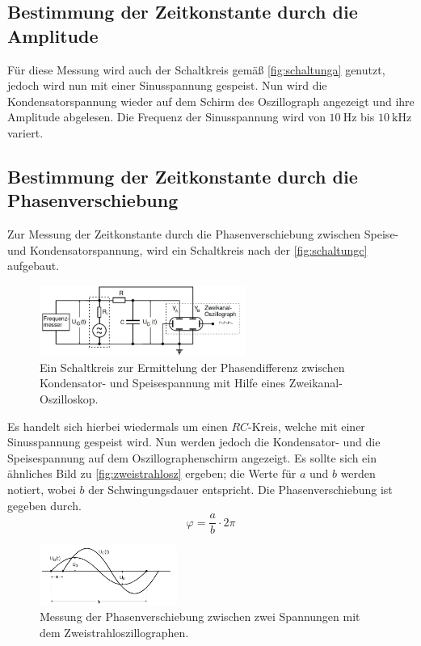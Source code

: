 \subsection{Bestimmung der Zeitkonstante durch die Amplitude}

    Für diese Messung wird auch der Schaltkreis gemäß \autoref{fig:schaltunga} genutzt, jedoch wird nun mit einer Sinusspannung gespeist. Nun wird die 
    Kondensatorspannung wieder auf dem Schirm des Oszillograph angezeigt und ihre Amplitude abgelesen. Die Frequenz der Sinusspannung wird von 
    $\SI{10}{\hertz}$ bis $\SI{10}{\kilo\hertz}$ variert. 


\subsection{Bestimmung der Zeitkonstante durch die Phasenverschiebung}

    Zur Messung der Zeitkonstante durch die Phasenverschiebung zwischen Speise- und Kondensatorspannung, wird ein Schaltkreis nach der \autoref{fig:schaltungc}
    aufgebaut. 

    \begin{figure}[H]
        \centering
        \includegraphics[width=0.6\textwidth]{bilder/aufbau_schaltungc.jpg}
        \caption{Ein Schaltkreis zur Ermittelung der Phasendifferenz zwischen Kondensator- und Speisespannung mit Hilfe eines Zweikanal-Oszilloskop. \cite{anleitung}}
        \label{fig:schaltungc}
    \end{figure}

    \noindent Es handelt sich hierbei wiedermals um einen $RC$-Kreis, welche mit einer Sinusspannung gespeist wird. Nun werden jedoch die Kondensator- und die 
    Speisespannung auf dem Oszillographenschirm angezeigt. Es sollte sich ein ähnliches Bild zu \autoref{fig:zweistrahlosz} ergeben; die Werte für $a$ und $b$
    werden notiert, wobei $b$ der Schwingungsdauer entspricht. Die Phasenverschiebung ist gegeben durch.
    \begin{equation*}
        \varphi = \frac{a}{b} \cdot 2 \pi
    \end{equation*}

    \begin{figure}
        \centering
        \includegraphics[width=0.4\textwidth]{bilder/Zweistrahloszillograph.PNG}
        \caption{Messung der Phasenverschiebung zwischen zwei Spannungen mit dem Zweistrahloszillographen.}
        \label{fig:zweistrahlosz}
    \end{figure}